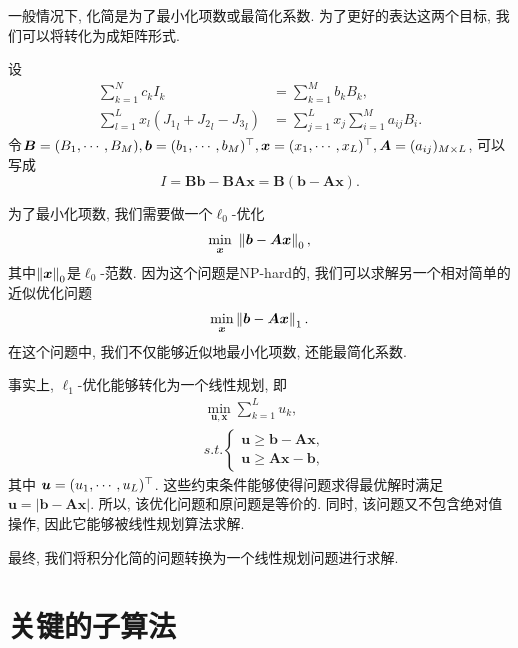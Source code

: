 一般情况下, 化简是为了最小化项数或最简化系数. 为了更好的表达这两个目标, 我们可以将转化为成矩阵形式. 

设 
\begin{equation}
\begin{split}
\sum_{k=1}^N{c_k I_k} &= \sum_{k=1}^M{b_k B_k},\\
\sum_{l=1}^L{x_l ({J_1}_l+{J_2}_l-{J_3}_l)} &= \sum_{j=1}^L{x_j \sum_{i=1}^M{a_{ij} B_i}}.
\end{split}
\end{equation} 
令$\bm B=(B_1,\cdots,B_M),\bm b=(b_1,\cdots,b_M)^\top,\bm x=(x_1,\cdots,x_L)^\top,\bm A=(a_{ij})_{M \times L}$, 可以写成 
\begin{equation}
I=\bm{B}\bm{b}-\bm{B}\bm{A}\bm{x}=\bm{B}(\bm{b}-\bm{A}\bm{x}).
\end{equation}

为了最小化项数, 我们需要做一个$\ell_0$-优化
\begin{equation}
    \underset{\bm x}\min~\left\Vert\bm{b}-\bm{A}\bm{x}\right\Vert_0,
\end{equation}
其中$\left\Vert\bm x\right\Vert_0$是$\ell_0$-范数. 因为这个问题是NP-hard的, 我们可以求解另一个相对简单的近似优化问题
\begin{equation}
\underset{\bm x}\min\left\Vert\bm{b}-\bm{A}\bm{x}\right\Vert_1.
\label{LAE}
\end{equation}
在这个问题中, 我们不仅能够近似地最小化项数, 还能最简化系数. 

事实上, $\ell_1$-优化能够转化为一个线性规划\citep[pp. 195--196]{L1_regression}, 即
\begin{equation}
\begin{split}
&\underset{\bm u,\bm x}\min \sum_{k=1}^L{u_k},\\
&s.t. \left\{
\begin{matrix}
\bm{u}\ge \bm{b}-\bm{A}\bm{x},\\ 
\bm{u}\ge \bm{A}\bm{x}-\bm{b},
\end{matrix}
\right.
\end{split}
\label{LP}
\end{equation}
其中 $\bm u=(u_1,\cdots,u_L)^\top$. 这些约束条件能够使得问题求得最优解时满足$\bm u = |\bm{b}-\bm{A}\bm{x}|$. 所以, 该优化问题和原问题是等价的. 同时, 该问题又不包含绝对值操作, 因此它能够被线性规划算法求解. 

最终, 我们将积分化简的问题转换为一个线性规划问题进行求解.

\section{关键的子算法} \label{Details-03}

